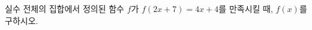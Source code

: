 \hspace*{2mm}\begin{minipage}[t]{\dimexpr\linewidth-2mm\relax}\vspace{0pt}
실수 전체의 집합에서 정의된 함수 $f$가 $f(2x+7)=4x+4$를 만족시킬 때, $f(x)$를 구하시오.\end{minipage}

